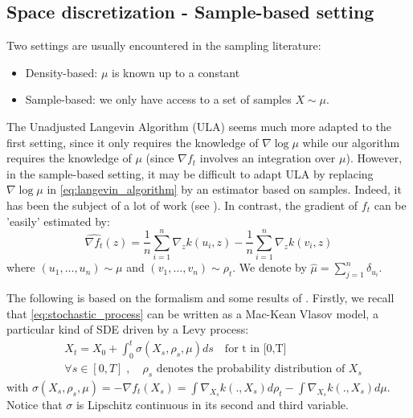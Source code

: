 

\subsection{Space discretization - Sample-based setting}

Two settings are usually encountered in the sampling literature:
\begin{itemize}
	\item Density-based: $\mu$ is known up to a constant
	\item Sample-based: we only have access to a set of samples $X \sim \mu$.
\end{itemize}

The Unadjusted Langevin Algorithm (ULA) seems much more adapted to the first setting, since it only requires the knowledge of $\nabla \log \mu$ while our algorithm requires the knowledge of $\mu$ (since $\nabla f_t$ involves an integration over $\mu$). However, in the sample-based setting, it may be difficult to adapt ULA by replacing $\nabla \log \mu$ in \eqref{eq:langevin_algorithm} by an estimator based on samples. Indeed, it has been the subject of a lot of work (see \cite{li2017gradient}). In contrast, the gradient of $f_t$ can be 'easily' estimated by:
\begin{equation}
\widehat{\nabla f_t}(z)= \frac{1}{n}\sum_{i=1}^{n}\nabla_{z}k(u_i,z) -\frac{1}{n}\sum_{i=1}^{n}\nabla_{z}k(v_i,z) 
\end{equation}
where $(u_1, \dots, u_n)\sim \mu$ and $(v_1, \dots, v_n)\sim \rho_t$. We denote by $\widehat{ \mu}=\sum_{j=1}^{n}\delta_{u_i}$.

\vspace{0.5cm}
The following is based on the formalism and some results of \cite{jourdain2007nonlinear}. Firstly, we recall that \eqref{eq:stochastic_process} can be written as a Mac-Kean Vlasov model, a particular kind of SDE driven by a Levy process:
\begin{align}\label{eq:theoretical_process}
&X_t=X_{0}+\int_{0}^t \sigma(X_s, \rho_s, \mu)ds \quad \text{for t in [0,T]}\\
&\forall s \in [0,T]\;,\quad \rho_s \text{ denotes the probability distribution of } X_s
\end{align}
with $\sigma(X_s, \rho_s, \mu)=-\nabla f_t(X_s)=\int \nabla_{X_s}k(.,X_s) d\rho_t -  \int \nabla_{X_s}k(.,X_s) d\mu$. Notice that $\sigma$ is Lipschitz continuous in its second and third variable.

